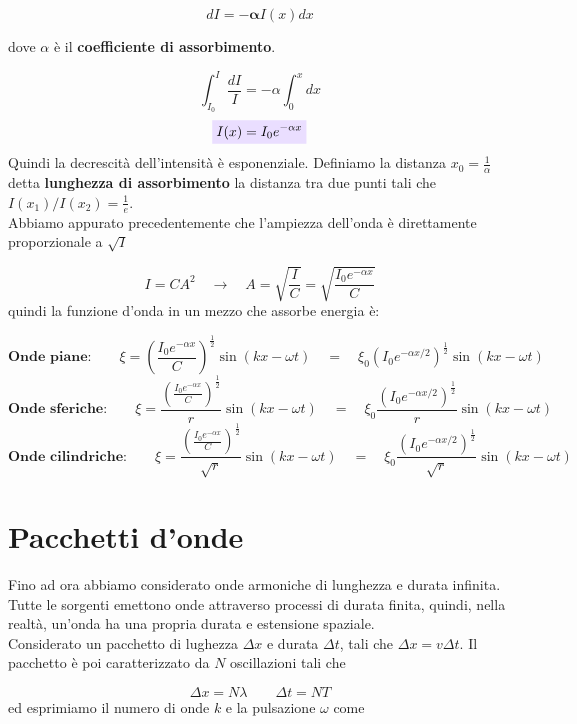 \documentclass[x11names]{report}
\newcommand{\viola}[1]{\colorbox{yred}{$\displaystyle #1$}}
\begin{document}
	\[ 
 	dI = -\boldsymbol{\alpha} I(x)dx
	\]
	
	dove \(\alpha\) è il \textbf{coefficiente di assorbimento}.
	
	\[ 
	\int_{I_0}^{I} \frac{dI}{I} = -\alpha\int_{0}^{x} dx 
	\]
	\begin{equation}
 		\viola{I(x) = I_0e^{-\alpha x}}
	\end{equation}
	Quindi la decrescità dell'intensità è esponenziale. Definiamo la distanza \(x_0 = \frac{1}{\alpha}\) detta \textbf{lunghezza di assorbimento} la distanza tra due punti tali che \(I(x_1)/I(x_2) = \frac{1}{e}\).\\
	
	\noindent
	Abbiamo appurato precedentemente che l'ampiezza dell'onda è direttamente proporzionale a \(\sqrt{I}\)
	
	\[ 
	I = CA^2 \quad \to \quad A = \sqrt{\frac{I}{C}} = \sqrt{\frac{I_0e^{-\alpha x}}{C}}
	\]
	quindi la funzione d'onda in un mezzo che assorbe energia è:
	
	\[ 
	\textbf{Onde piane:}\qquad \xi = \left(\frac{I_0e^{-\alpha x}}{C}\right)^{\frac{1}{2}} \sin\left(kx-\omega t\right) \quad = \quad \xi_0 \left(I_0e^{-\alpha x/2}\right)^{\frac{1}{2}}\sin\left(kx-\omega t\right)
	\]
	\[ 
	\textbf{Onde sferiche:}\qquad \xi = \frac{\left(\frac{I_0e^{-\alpha x}}{C}\right)^{\frac{1}{2}}}{r} \sin\left(kx-\omega t\right) \quad = \quad \xi_0 \frac{\left(I_0e^{-\alpha x/2}\right)^{\frac{1}{2}}}{r}\sin\left(kx-\omega t\right)
	\]
	\[ 
	\textbf{Onde cilindriche:}\qquad \xi = \frac{\left(\frac{I_0e^{-\alpha x}}{C}\right)^{\frac{1}{2}}}{\sqrt{r}} \sin\left(kx-\omega t\right) \quad = \quad \xi_0 \frac{\left(I_0e^{-\alpha x/2}\right)^{\frac{1}{2}}}{\sqrt{r}}\sin\left(kx-\omega t\right)
	\]
	
	\newpage
	\section{Pacchetti d'onde}
	Fino ad ora abbiamo considerato onde armoniche di lunghezza e durata infinita. Tutte le sorgenti emettono onde attraverso processi di durata finita, quindi, nella realtà, un'onda ha una propria durata e estensione spaziale.\\
	
	\noindent
	Considerato un pacchetto di lughezza \(\Delta x\) e durata \(\Delta t\), tali che \(\Delta x = v\Delta t\). Il pacchetto è poi caratterizzato da \(N\) oscillazioni tali che
	
	\[ 
\Delta x  =N \lambda \qquad \Delta t = NT 
	\]
	ed esprimiamo il numero di onde \(k\) e la pulsazione \(\omega\) come
	
\end{document}
